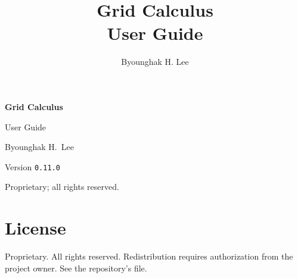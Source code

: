 \documentclass[11pt,oneside,openany]{memoir}
\title{Grid Calculus \\ \large User Guide}
\author{Byounghak H. Lee}
\date{}
\begin{document}

\frontmatter

\begin{titlingpage}
    \centering
    \vspace*{2cm}
    {\Huge\bfseries Grid Calculus \par}
    \vspace{0.5cm}
    {\Large User Guide \par}
    \vspace{1.5cm}
    {\large Byounghak H.~Lee \par}
    \vspace{0.5cm}
    {Version \texttt{0.11.0} \par}
    \vfill
    {\small Proprietary; all rights reserved.}
\end{titlingpage}

\tableofcontents*


\mainmatter





















\backmatter

\chapter*{License}

Proprietary. All rights reserved. Redistribution requires authorization
from the project owner. See the repository's  file.
\end{document}
